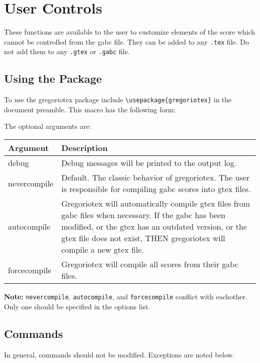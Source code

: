 \section{User Controls}

These functions are available to the user to customize elements of the
score which cannot be controlled from the gabc file. They can be added
to any \verb=.tex= file. Do not add them to any \verb=.gtex= or
\verb=.gabc= file.

\subsection{Using the Package}

To use the gregoriotex package include \verb=\usepackage{gregoriotex}=
in the document preamble. This macro has the following form:


The optional arguments are:

\bigskip{}
\begin{tabular}{lp{}}
  Argument & Description \\
  \hline
  debug & Debug messages will be printed to the output log. \\
  \hline
  nevercompile & Default. The classic behavior of gregoriotex. The user is
                 responsible for compiling gabc scores into gtex files.\\
  autocompile & Gregoriotex will automatically compile gtex files from gabc
                files when necessary. If the gabc has been modified, or the
                gtex has an outdated version, or the gtex file does not exist,
                THEN gregoriotex will compile a new gtex file.\\
  forcecompile & Gregoriotex will compile all scores from their gabc files.\\
\end{tabular}\bigskip

\textbf{Note:} \verb=nevercompile=, \verb=autocompile=, and
\verb=forcecompile= conflict with eachother. Only one should be
specified in the options list.

\subsection{Commands}

In general, commands should not be modified.  Exceptions are noted below.

